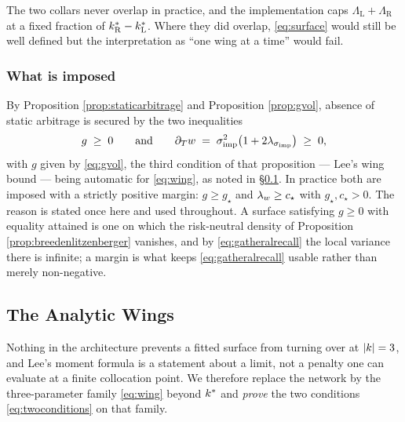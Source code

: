 \begin{remark}
The two collars never overlap in practice, and the implementation caps
$\Lambda_{\mathrm{L}}+\Lambda_{\mathrm{R}}$ at a fixed fraction of
$k^{*}_{\mathrm{R}}-k^{*}_{\mathrm{L}}$. Where they did overlap, \eqref{eq:surface} would
still be well defined but the interpretation as ``one wing at a time'' would fail.
\end{remark}

\subsubsection*{What is imposed}

By Proposition \ref{prop:staticarbitrage} and Proposition \ref{prop:gvol}, absence of static
arbitrage is secured by the two inequalities
\begin{equation}\label{eq:twoconditions}
  g\;\ge\;0
  \qquad\text{and}\qquad
  \partial_{T}w\;=\;\sigma_{\mathrm{imp}}^{2}\bigl(1+2\lambda_{\sigma_{\mathrm{imp}}}\bigr)\;\ge\;0 ,
\end{equation}
with $g$ given by \eqref{eq:gvol}, the third condition of that proposition --- Lee's wing bound
\cite{lee2004} --- being automatic for \eqref{eq:wing}, as noted in \S\ref{subsec:wings}. In practice
both are imposed with a strictly positive margin: $g\ge g_{\star}$ and $\lambda_{w}\ge c_{\star}$
with $g_{\star},c_{\star}>0$. The reason is stated once here and used throughout. A surface satisfying
$g\ge0$ with equality attained is one on which the risk-neutral density of Proposition
\ref{prop:breedenlitzenberger} vanishes, and by \eqref{eq:gatheralrecall} the local variance there is
infinite; a margin is what keeps \eqref{eq:gatheralrecall} usable rather than merely non-negative.

\subsection{The Analytic Wings}
\label{subsec:wings}

 Nothing in the architecture prevents a fitted surface from turning over at $|k|=3$, and
Lee's moment formula \cite{lee2004} is a statement about a limit, not
a penalty one can evaluate at a finite collocation point. We therefore replace the network by the
three-parameter family \eqref{eq:wing} beyond $k^{*}$ and \emph{prove} the two conditions
\eqref{eq:twoconditions} on that family.

